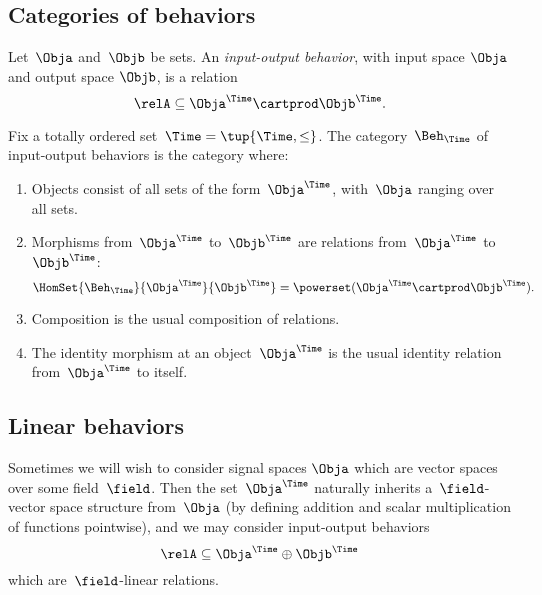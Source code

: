     \subsection{Categories of behaviors}

    \begin{definition}
        Let~$\Obja$ and~$\Objb$ be sets.
        An \emph{input-output behavior}, with input space $\Obja$ and output space $\Objb$, is a relation
        \begin{equation*}
            \relA \subseteq \Obja^\Time \cartprod \Objb^\Time.
        \end{equation*}
    \end{definition}

    \begin{definition}
        Fix a totally ordered set~$\Time = \tup{\Time, \leq}$.
        The category~$\Beh_\Time$ of input-output behaviors is the category where:
        \begin{enumerate}
            \item Objects consist of all sets of the form~$\Obja^\Time$, with~$\Obja$ ranging over all sets.
            \item Morphisms from~$\Obja^\Time$ to~$\Objb^\Time$ are relations from~$\Obja^\Time$ to~$\Objb^\Time$:
                  \begin{equation}
                      \HomSet{\Beh_\Time}{\Obja^\Time}{\Objb^\Time} = \powerset (\Obja^\Time \cartprod \Objb^\Time).
                  \end{equation}
            \item Composition is the usual composition of relations.
            \item The identity morphism at an object~$\Obja^\Time$ is the usual identity relation from~$\Obja^\Time$ to itself.
        \end{enumerate}
    \end{definition}



\subsection{Linear behaviors}

    Sometimes we will wish to consider signal spaces $\Obja$ which are vector spaces over some field~$\field$.
    Then the set~$\Obja^\Time$ naturally inherits a~$\field$-vector space structure from~$\Obja$ (by defining addition and scalar multiplication of functions pointwise), and we may consider input-output behaviors
    \begin{equation*}
        \relA \subseteq \Obja^\Time \oplus \Objb^\Time
    \end{equation*}
    which are~$\field$-linear relations.

